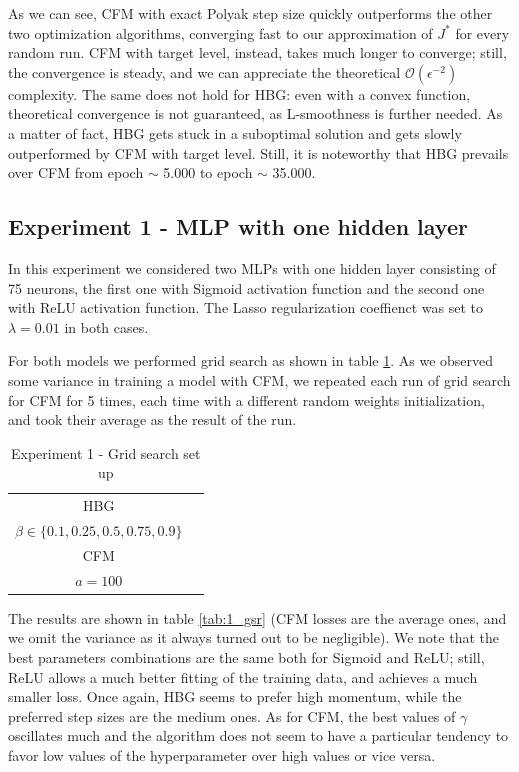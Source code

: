 As we can see, CFM with exact Polyak step size quickly outperforms the other two optimization algorithms, converging fast to our approximation of $J^*$ for every random run. CFM with target level, instead, takes much longer to converge; still, the convergence is steady, and we can appreciate the theoretical $\mathcal{O}(\epsilon^{-2})$ complexity. The same does not hold for HBG: even with a convex function, theoretical convergence is not guaranteed, as L-smoothness is further needed. As a matter of fact, HBG gets stuck in a suboptimal solution and gets slowly outperformed by CFM with target level. Still, it is noteworthy that HBG prevails over CFM from epoch $\sim$ 5.000 to epoch $\sim$ 35.000.

\subsection{Experiment 1 - MLP with one hidden layer}
\label{exp1}
In this experiment we considered two MLPs with one hidden layer consisting of 75 neurons, the first one with Sigmoid activation function and the second one with ReLU activation function. The Lasso regularization coeffienct was set to $\lambda = 0.01$ in both cases.

For both models we performed grid search as shown in table \ref{tab:1_gs}. As we observed some variance in training a model with CFM, we repeated each run of grid search for CFM for 5 times, each time with a different random weights initialization, and took their average as the result of the run. 

\begin{table}[htbp]
    \centering
    \begin{tabular}{|c|c|}
        \hline
        HBG & \makecell{$\alpha \in 10^{-3} \times \{0.5, 0.75, 1, 2.5, 5, 7.75, 10, 25, 50\}$ \\ $\beta \in \{0.1, 0.25, 0.5, 0.75, 0.9\}$} \\
        \hline
        CFM & \makecell{$\gamma \in \{0.5, 0.75, 1, 1.25, 1.5, 1.75\}$ \\ $a = 100$} \\
        \hline
    \end{tabular}
    \caption{Experiment 1 - Grid search set up}
    \label{tab:1_gs}
\end{table}

The results are shown in table \ref{tab:1_gsr} (CFM losses are the average ones, and we omit the variance as it always turned out to be negligible). We note that the best parameters combinations are the same both for Sigmoid and ReLU; still, ReLU allows a much better fitting of the training data, and achieves a much smaller loss. Once again, HBG seems to prefer high momentum, while the preferred step sizes are the medium ones. As for CFM, the best values of $\gamma$ oscillates much and the algorithm does not seem to have a particular tendency to favor low values of the hyperparameter over high values or vice versa.


